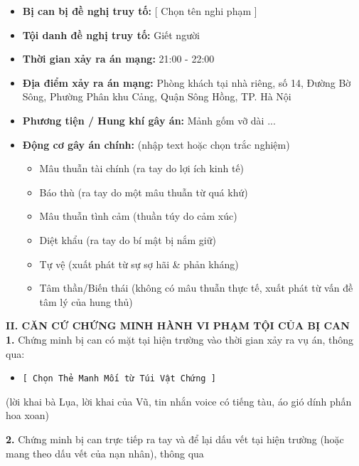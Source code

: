 \documentclass[12pt,a4paper]{article}
\begin{document}
\begin{itemize}[leftmargin=*, itemsep=2pt, topsep=2pt, parsep=0pt]
  \item \textbf{Bị can bị đề nghị truy tố:} [ Chọn tên nghi phạm ]
  \item \textbf{Tội danh đề nghị truy tố:} Giết người
  \item \textbf{Thời gian xảy ra án mạng:} 21:00 - 22:00
  \item \textbf{Địa điểm xảy ra án mạng:} Phòng khách tại nhà riêng, số 14, Đường Bờ Sông, Phường Phân khu Cảng, Quận Sông Hồng, TP. Hà Nội
  \item \textbf{Phương tiện / Hung khí gây án:} Mảnh gốm vỡ dài ...
  \item \textbf{Động cơ gây án chính:} (nhập text hoặc chọn trắc nghiệm)
\begin{itemize}[leftmargin=*, itemsep=2pt, topsep=2pt, parsep=0pt]
  \item Mâu thuẫn tài chính (ra tay do lợi ích kinh tế)
  \item Báo thù (ra tay do một mâu thuẫn từ quá khứ)
  \item Mâu thuẫn tình cảm (thuần túy do cảm xúc)
  \item Diệt khẩu (ra tay do bí mật bị nắm giữ)
  \item Tự vệ (xuất phát từ sự sợ hãi \& phản kháng)
  \item Tâm thần/Biến thái (không có mâu thuẫn thực tế, xuất phát từ vấn đề tâm lý của hung thủ)


\end{itemize}
\end{itemize}

\vspace{0.3cm}\noindent\textbf{\large II. CĂN CỨ CHỨNG MINH HÀNH VI PHẠM TỘI CỦA BỊ CAN}\\[0.15cm]


\textbf{1.} Chứng minh bị can có mặt tại hiện trường vào thời gian xảy ra vụ án, thông qua:

\begin{itemize}[leftmargin=*, itemsep=2pt, topsep=2pt, parsep=0pt]
  \item \texttt{[ Chọn Thẻ Manh Mối từ Túi Vật Chứng ]}
\end{itemize}
(lời khai bà Lụa, lời khai của Vũ, tin nhắn voice có tiếng tàu, áo gió dính phấn hoa xoan)


\textbf{2.} Chứng minh bị can trực tiếp ra tay và để lại dấu vết tại hiện trường (hoặc mang theo dấu vết của nạn nhân), thông qua
\end{document}
